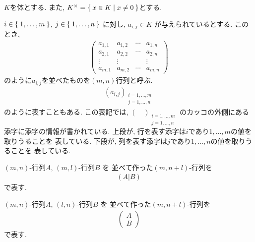 
$K$を体とする.
また, $K^\times=\Set{x\in K|x\neq 0}$とする.

$i\in\Set{1,\ldots,m}$,
$j\in\Set{1,\ldots,n}$
に対し,
$a_{i,j}\in K$
が与えられているとする.
このとき,
\begin{align*}
    \begin{pmatrix}
      a_{1,1}&a_{1,2}&\cdots &a_{1,n}\\
      a_{2,1}&a_{2,2}&\cdots &a_{2,n}\\
      \vdots&\vdots &&\vdots\\
      a_{m,1}&a_{m,2}&\cdots &a_{m,n}
    \end{pmatrix}
\end{align*}
のように$a_{i,j}$を並べたものを$(m,n)$行列と呼ぶ.
\begin{align*}
  (a_{i,j})_{\substack{i=1,\ldots,m\\j=1,\ldots,n}}
\end{align*}
のように表すこともある.
この表記では,
$(\quad)_{\substack{i=1,\ldots,m\\j=1,\ldots,n}}$
のカッコの外側にある添字に添字の情報が書かれている.
上段が, 行を表す添字は$i$であり$1,\ldots,m$の値を取りうることを
表している.
下段が, 列を表す添字は$j$であり$1,\ldots,n$の値を取りうることを
表している.

$(m,n)$-行列$A$,
$(m,l)$-行列$B$
を
並べて作った$(m,n+l)$-行列を
\begin{align*}(A|B)\end{align*}
で表す.

$(m,n)$-行列$A$,
$(l,n)$-行列$B$
を
並べて作った$(m,n+l)$-行列を
\begin{align*}
  \begin{pmatrix}A\\\hline B\end{pmatrix}\end{align*}
で表す.


